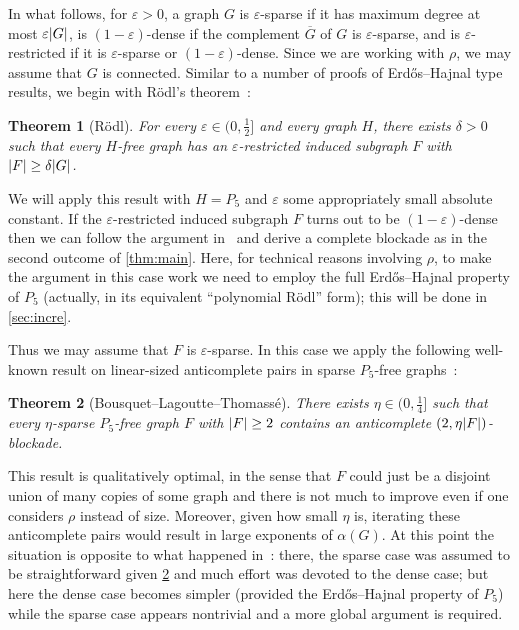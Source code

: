 \documentclass[11pt,reqno]{amsart}
\newtheorem{theorem}{Theorem}[section]
\newcommand{\dd}{\textquotedblleft}
\newcommand{\ee}{\textquotedblright}
\newcommand{\eps}{\varepsilon}
\newcommand{\erh}{Erd\H{o}s--Hajnal}
\DeclarePairedDelimiter\abs{\lvert}{\rvert}%
\begin{document}
	In what follows, for $\eps>0$, a graph $G$ is $\eps$-sparse if it has maximum degree at most $\eps\abs G$, is $(1-\eps)$-dense if the complement $\overline G$ of $G$ is $\eps$-sparse, and is $\eps$-restricted if it is $\eps$-sparse or $(1-\eps)$-dense.
	Since we are working with $\rho$, we may assume that $G$ is connected.
	Similar to a number of proofs of \erh{} type results, we begin with R\"odl's theorem~\cite{MR837962}:
	\begin{theorem}
		[R\"odl]
		\label{thm:rodl}
		For every $\eps\in(0,\frac12]$ and every graph $H$, there exists $\delta>0$ such that every $H$-free graph has an $\eps$-restricted induced subgraph $F$ with $\abs F\ge\delta\abs G$.
	\end{theorem}
	
	We will apply this result with $H=P_5$ and $\eps$ some appropriately small absolute constant.
	If the $\eps$-restricted induced subgraph $F$ turns out to be $(1-\eps)$-dense then we can follow the argument in~\cite[Section 7]{density7} and derive a complete blockade as in the second outcome of \cref{thm:main}.
	Here, for technical reasons involving $\rho$, to make the argument in this case work we need to employ the full \erh{} property of $P_5$ (actually, in its equivalent \dd polynomial R\"odl\ee{} form);
	this will be done in \cref{sec:incre}.
	
	Thus we may assume that $F$ is $\eps$-sparse. In this case we apply the following well-known result on linear-sized anticomplete pairs in sparse $P_5$-free graphs~\cite{MR3343757}:
	\begin{theorem}
		[Bousquet--Lagoutte--Thomass\'e]
		\label{thm:p5sparse}
		There exists $\eta\in(0,\frac14]$ such that every $\eta$-sparse $P_5$-free graph $F$ with $\abs F\ge2$ contains an anticomplete $(2,\eta\abs F)$-blockade.
	\end{theorem}
	
	This result is qualitatively optimal, in the sense that $F$ could just be a disjoint union of many copies of some graph and there is not much to improve even if one considers $\rho$ instead of size. Moreover, given how small $\eta$ is, iterating these anticomplete pairs would result in large exponents of $\alpha(G)$.
	At this point the situation is opposite to what happened in~\cite{density7}: there, the sparse case was assumed to be straightforward given \cref{thm:p5sparse} and much effort was devoted to the dense case; but here the dense case becomes simpler (provided the \erh{} property of $P_5$) while the sparse case appears nontrivial and a more global argument is required.
	
\end{document}
